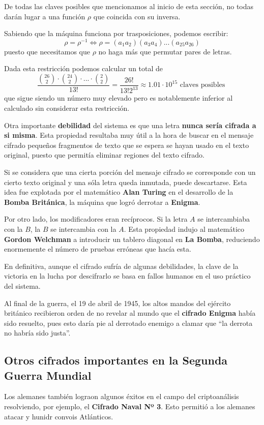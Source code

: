 \documentclass[nochap]{apuntesURJC}
\begin{document}
De todas las claves posibles que mencionamos al inicio de esta sección, no todas darán lugar a una función $\rho$ que coincida con su inversa.

Sabiendo que la máquina funciona por trasposiciones, podemos escribir:
\[\rho = \rho^{-1} \iff \rho = (a_1a_2)(a_3a_4)...(a_{25}a_{26})\]
puesto que necesitamos que $\rho$ no haga más que permutar pares de letras.

Dada esta restricción podemos calcular un total de
\[\frac{{26 \choose 2} \cdot {24 \choose 2} \cdot ... \cdot {2 \choose 2}}{13!} =\frac{26!}{13!2^{13}} \approx 1.01 \cdot 10^{15} \text{ claves posibles }\]
que sigue siendo un número muy elevado pero es notablemente inferior al calculado sin considerar esta restricción.

Otra importante \textbf{debilidad} del sistema es que una letra \textbf{nunca sería cifrada a si misma}. Esta propiedad resultaba muy útil a la hora de buscar en el mensaje cifrado pequeños fragmentos de texto que se espera se hayan usado en el texto original, puesto que permitía eliminar regiones del texto cifrado.

Si se considera que una cierta porción del mensaje cifrado se corresponde con un cierto texto original y una sóla letra queda inmutada, puede descartarse. Esta idea fue explotada por el matemático \textbf{Alan Turing} en el desarrollo de la \textbf{Bomba Británica}, la máquina que logró derrotar a \textbf{Enigma}.

Por otro lado, los modificadores eran recíprocos. Si la letra $A$ se intercambiaba con la $B$, la $B$ se intercambia con la $A$. Esta propiedad indujo al matemático \textbf{Gordon Welchman} a introducir un tablero diagonal en \textbf{La Bomba}, reduciendo enormemente el número de pruebas erróneas que hacía esta.

En definitiva, aunque el cifrado sufría de algunas debilidades, la clave de la victoria en la lucha por descifrarlo se basa en fallos humanos en el uso práctico del sistema.

Al final de la guerra, el 19 de abril de 1945, los altos mandos del ejército británico recibieron orden de no revelar al mundo que el \textbf{cifrado Enigma} había sido resuelto, pues esto daría pie al derrotado enemigo a clamar que ``la derrota no habría sido justa''.

\subsection{Otros cifrados importantes en la Segunda Guerra Mundial}
Los alemanes también lograon algunos éxitos en el campo del criptoanálisis resolviendo, por ejemplo, el \textbf{Cifrado Naval Nº 3}. Esto permitió a los alemanes atacar y hunidr convois Atlánticos.
\end{document}
